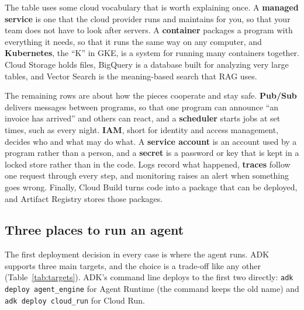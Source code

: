 The table uses some cloud vocabulary that is worth explaining once. A \textbf{managed service} is one that the cloud provider runs and maintains for you, so that your team does not have to look after servers. A \textbf{container} packages a program with everything it needs, so that it runs the same way on any computer, and \textbf{Kubernetes}, the ``K'' in GKE, is a system for running many containers together. Cloud Storage holds files, BigQuery is a database built for analyzing very large tables, and Vector Search is the meaning-based search that RAG uses.

The remaining rows are about how the pieces cooperate and stay safe. \textbf{Pub/Sub} delivers messages between programs, so that one program can announce ``an invoice has arrived'' and others can react, and a \textbf{scheduler} starts jobs at set times, such as every night. \textbf{IAM}, short for identity and access management, decides who and what may do what. A \textbf{service account} is an account used by a program rather than a person, and a \textbf{secret} is a password or key that is kept in a locked store rather than in the code. Logs record what happened, \textbf{traces} follow one request through every step, and monitoring raises an alert when something goes wrong. Finally, Cloud Build turns code into a package that can be deployed, and Artifact Registry stores those packages.


\subsection{Three places to run an agent}

The first deployment decision in every case is where the agent runs. ADK supports three main targets, and the choice is a trade-off like any other (Table~\ref{tab:targets}). ADK's command line deploys to the first two directly: \texttt{adk deploy agent\_engine} for Agent Runtime (the command keeps the old name) and \texttt{adk deploy cloud\_run} for Cloud Run.

